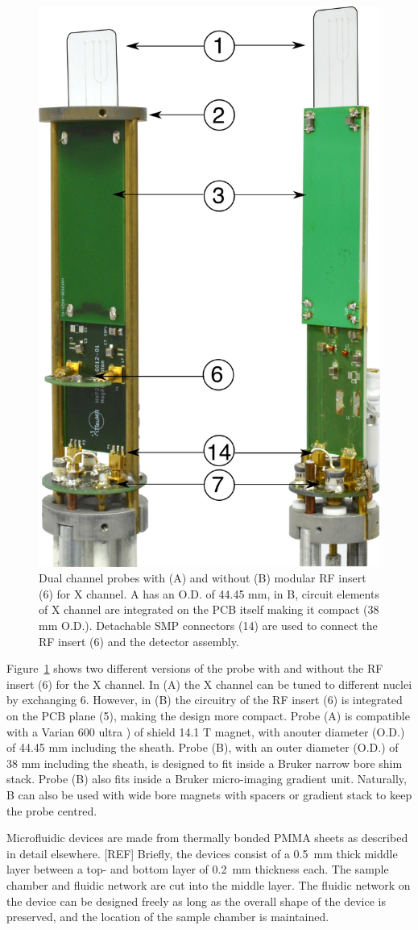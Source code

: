 \documentclass[preprint,12pt]{article}
\begin{document}
\begin{figure}
\centering
\includegraphics[width=.5\linewidth,keepaspectratio=true]{./figures/ms5n17-tlp-im-181007-both-detectors.png}
\caption{Dual channel probes with (A) and without (B) modular RF insert (6) for X channel. 
A has an O.D. of 44.45 mm, in B, circuit elements of X channel are integrated on the 
PCB itself making it compact (38 mm O.D.). Detachable SMP connectors (14) are used to 
connect the RF insert (6) and the detector assembly. }
\label{fig:ProbePhoto}
\end{figure}
Figure~\ref{fig:ProbePhoto} shows two different versions of the probe with and without the RF insert (6) 
for the X channel. In (A) the X channel can be tuned to different nuclei by exchanging 6. 
However, in (B) the circuitry of the RF insert (6) is integrated on the PCB plane (5), 
making the design more compact.
 Probe (A) is compatible with a Varian 600 ultra ) of
shield 14.1 T magnet, with anouter diameter (O.D.) of 44.45 mm including the sheath. Probe (B), with an 
outer diameter (O.D.) of 38 mm including the sheath, is designed to fit inside a 
Bruker narrow bore shim stack. 
Probe (B) also fits inside a Bruker micro-imaging gradient unit. Naturally, B can also be used with 
wide bore magnets with spacers or gradient stack to keep the probe centred.

Microfluidic devices are made from thermally bonded PMMA sheets as described in detail elsewhere. [REF]
Briefly, the devices consist of a 0.5~mm thick middle layer between a top- and bottom layer of 
0.2~mm thickness each. The sample chamber and fluidic network are cut into the middle layer.
The fluidic network on the device can be designed freely as long as the overall shape of the
device is preserved, and the location of the sample chamber is maintained.
\end{document}
